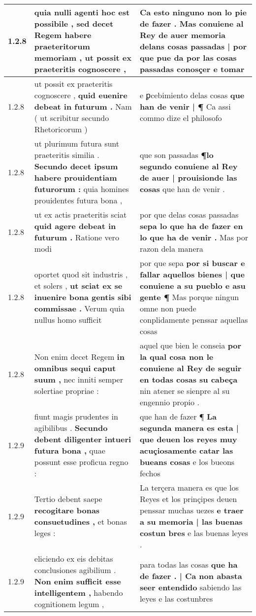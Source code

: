 \begin{tabular}{|p{1cm}|p{6.5cm}|p{6.5cm}|}
1.2.8 & quia nulli agenti hoc est possibile , \textbf{ sed decet Regem habere praeteritorum memoriam , } ut possit ex praeteritis cognoscere , & Ca esto ninguno non lo pie de fazer . \textbf{ Mas conuiene al Rey de auer memoria delans cosas passadas | por que pue da } por las cosas passadas conosçer e tomar \\\hline
1.2.8 & ut possit ex praeteritis cognoscere , \textbf{ quid euenire debeat in futurum . } Nam ( ut scribitur secundo Rhetoricorum ) & e ꝑcebimiento delas cosas \textbf{ que han de venir | ¶ } Ca assi commo dize el philosofo \\\hline
1.2.8 & ut plurimum futura sunt praeteritis similia . \textbf{ Secundo decet ipsum habere prouidentiam futurorum : } quia homines prouidentes futura bona , & que son passadas \textbf{ ¶lo segundo conuiene al Rey de auer | prouisionde las cosas } que han de venir . \\\hline
1.2.8 & ut ex actis praeteritis sciat \textbf{ quid agere debeat in futurum . } Ratione vero modi & por que delas cosas passadas \textbf{ sepa lo que ha de fazer en lo que ha de venir . } Mas por razon dela manera \\\hline
1.2.8 & oportet quod sit industris , et solers , \textbf{ ut sciat ex se inuenire bona gentis sibi commissae . } Verum quia nullus homo sufficit & por que sepa \textbf{ por si buscar e fallar aquellos bienes | que conuiene a su pueblo e asu gente ¶ } Mas porque ningun omne non puede conplidamente penssar aquellas cosas \\\hline
1.2.8 & Non enim decet Regem \textbf{ in omnibus sequi caput suum , } nec inniti semper solertiae propriae : & aquel que bien le conseia \textbf{ por la qual cosa non le conuiene al Rey de seguir en todas cosas su cabeça } nin atener se sienpre al su engennio propio . \\\hline
1.2.9 & fiunt magis prudentes in agibilibus . \textbf{ Secundo debent diligenter intueri futura bona , } quae possunt esse proficua regno : & que han de fazer ¶ \textbf{ La segunda manera es esta | que deuen los reyes muy acuçiosamente catar las bueans cosas } e los bueons fechos \\\hline
1.2.9 & Tertio debent saepe \textbf{ recogitare bonas consuetudines , } et bonas leges : & La terçera manera es que los Reyes et los prinçipes deuen penssar muchas uezes \textbf{ e traer a su memoria | las buenas costun bres } e las buenas leyes . \\\hline
1.2.9 & eliciendo ex eis debitas conclusiones agibilium . \textbf{ Non enim sufficit esse intelligentem , } habendo cognitionem legum , & para todas las cosas \textbf{ que ha de fazer . | Ca non abasta seer entendido } sabiendo las leyes e las costunbres \\\hline

\end{tabular}
